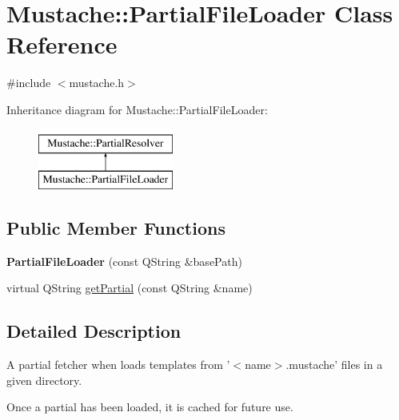 \hypertarget{classMustache_1_1PartialFileLoader}{\section{Mustache\-:\-:Partial\-File\-Loader Class Reference}
\label{classMustache_1_1PartialFileLoader}
}


{\ttfamily \#include $<$mustache.\-h$>$}

Inheritance diagram for Mustache\-:\-:Partial\-File\-Loader\-:\begin{figure}[H]
\begin{center}
\leavevmode
\includegraphics[height=2.000000cm]{da/d31/classMustache_1_1PartialFileLoader}
\end{center}
\end{figure}
\subsection*{Public Member Functions}
\begin{DoxyCompactItemize}
\item 
\hypertarget{classMustache_1_1PartialFileLoader_aa29e049400b033d96c184a72b03306bf}{{\bfseries Partial\-File\-Loader} (const Q\-String \&base\-Path)}\label{classMustache_1_1PartialFileLoader_aa29e049400b033d96c184a72b03306bf}

\item 
virtual Q\-String \hyperlink{classMustache_1_1PartialFileLoader_a36ba8b817708a8755293db46bceb0dbb}{get\-Partial} (const Q\-String \&name)
\end{DoxyCompactItemize}


\subsection{Detailed Description}
A partial fetcher when loads templates from '$<$name$>$.mustache' files in a given directory.

Once a partial has been loaded, it is cached for future use. 

